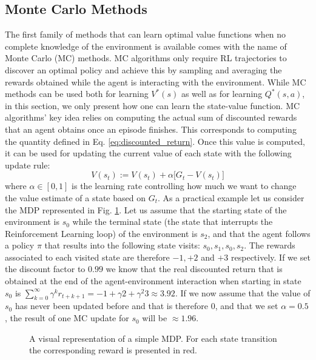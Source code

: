 \subsection{Monte Carlo Methods}
The first family of methods that can learn optimal value functions when no complete knowledge of the environment is available comes with the name of Monte Carlo (MC) methods. MC algorithms only require RL trajectories to discover an optimal policy and achieve this by sampling and averaging the rewards obtained while the agent is interacting with the environment. While MC methods can be used both for learning $V^{*}(s)$ as well as for learning $Q^{*}(s,a)$, in this section, we only present how one can learn the state-value function. MC algorithms' key idea relies on computing the actual sum of discounted rewards that an agent obtains once an episode finishes. This corresponds to computing the quantity defined in Eq. \ref{eq:discounted_return}. Once this value is computed, it can be used for updating the current value of each state with the following update rule: 
\begin{equation}
	V(s_t) := V(s_t) + \alpha \big[G_t - V(s_t) \big]
\label{eq:mc_update}
\end{equation}
where $\alpha \in [0,1]$ is the learning rate controlling how much we want to change the value estimate of a state based on $G_t$. As a practical example let us consider the MDP represented in Fig. \ref{fig:mdp}. Let us assume that the starting state of the environment is $s_0$ while the terminal state (the state that interrupts the Reinforcement Learning loop) of the environment is $s_2$, and that the agent follows a policy $\pi$ that results into the following state visits: $s_0, s_1, s_0, s_2$. The rewards associated to each visited state are therefore $-1, +2$ and $+3$ respectively. If we set the discount factor to $0.99$ we know that the real discounted return that is obtained at the end of the agent-environment interaction when starting in state $s_0$ is $\sum_{k=0}^{\infty}\gamma^{k} r_{t+k+1} = -1+\gamma2+\gamma^{2}3 \approx 3.92$. If we now assume that the value of $s_0$ has never been updated before and that is therefore $0$, and that we set $\alpha=0.5$, the result of one MC update for $s_0$ will be $\approx 1.96$. 

\begin{figure}[ht!]
	\centering
	
\caption{A visual representation of a simple MDP. For each state transition the corresponding reward is presented in red.}
\label{fig:mdp}
\end{figure}

